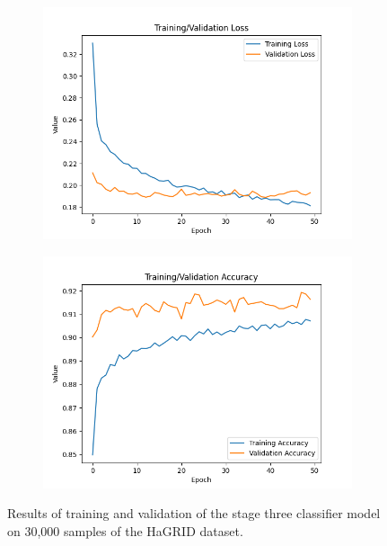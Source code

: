 \documentclass{article}
\begin{document}
\begin{figure}[h]
    \centering
    \begin{subfigure}[T]{0.5\textwidth}
        \centering
        \includegraphics[width=\linewidth]{loss_graph.png}
    \end{subfigure}\hfill
    \begin{subfigure}[T]{0.5\textwidth}
        \centering
        \includegraphics[width=\linewidth]{accuracy_graph.png}
    \end{subfigure}
    \caption{Results of training and validation of the stage three classifier model on 30,000 samples of the HaGRID \cite{Alexander_2024} dataset.}
    \label{fig:graphs}
\end{figure}
\end{document}
